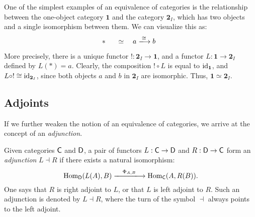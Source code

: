 \begin{example}
  One of the simplest examples of an equivalence of categories is the relationship between the one-object category \( \mathbf{1} \) and the category \( \mathbf{2}_I \), which has two objects and a single isomorphism between them. We can visualize this as:
$$
\ast \;\; \quad \simeq \quad a \xlongrightarrow{\;\cong\;} b \;\; 
$$

More precisely, there is a unique functor \( ! : \mathbf{2}_I \to \mathbf{1} \), and a functor \( L : \mathbf{1} \to \mathbf{2}_I \) defined by \( L(\ast) = a \). Clearly, the composition \( ! \circ L \) is equal to \( \mathrm{id}_{\mathbf{1}} \), and \( L \circ ! \cong \mathrm{id}_{\mathbf{2}_I} \), since both objects \( a \) and \( b \) in \( \mathbf{2}_I \) are isomorphic. Thus, \( \mathbf{1} \simeq \mathbf{2}_I \).
\end{example}

\subsection{Adjoints}
If we further weaken the notion of an equivalence of categories, we arrive at the concept of an \emph{adjunction}. 

\begin{definition}
  Given categories \(\mathsf{C}\) and \(\mathsf{D}\), a pair of functors \(L: \mathsf{C} \to \mathsf{D}\) and \(R: \mathsf{D} \to \mathsf{C} \) form an \emph{adjunction} \(L \dashv R\) if there exists a natural isomorphism:
\[
\mathrm{Hom}_{\catD}(L(A), B) 
\xlongrightarrow{\quad \Phi_{A,B} \quad}
\mathrm{Hom}_{\catC}(A, R(B)).
\]
One says that $R$ is right adjoint to $L$, or that $L$ is left adjoint to $R$. Such an adjunction is denoted by $L \dashv R$, where the turn of the symbol $\dashv$ always points to the left adjoint.

\end{definition}

